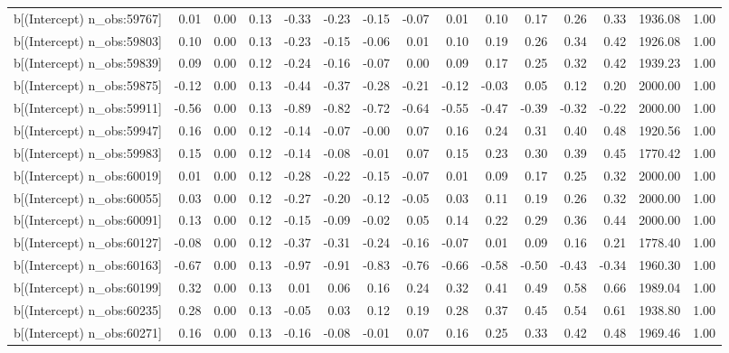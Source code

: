 \begin{table}[ht]
\begin{tabular}{rrrrrrrrrrrrrrr}
  b[(Intercept) n\_obs:59767] & 0.01 & 0.00 & 0.13 & -0.33 & -0.23 & -0.15 & -0.07 & 0.01 & 0.10 & 0.17 & 0.26 & 0.33 & 1936.08 & 1.00 \\ 
  b[(Intercept) n\_obs:59803] & 0.10 & 0.00 & 0.13 & -0.23 & -0.15 & -0.06 & 0.01 & 0.10 & 0.19 & 0.26 & 0.34 & 0.42 & 1926.08 & 1.00 \\ 
  b[(Intercept) n\_obs:59839] & 0.09 & 0.00 & 0.12 & -0.24 & -0.16 & -0.07 & 0.00 & 0.09 & 0.17 & 0.25 & 0.32 & 0.42 & 1939.23 & 1.00 \\ 
  b[(Intercept) n\_obs:59875] & -0.12 & 0.00 & 0.13 & -0.44 & -0.37 & -0.28 & -0.21 & -0.12 & -0.03 & 0.05 & 0.12 & 0.20 & 2000.00 & 1.00 \\ 
  b[(Intercept) n\_obs:59911] & -0.56 & 0.00 & 0.13 & -0.89 & -0.82 & -0.72 & -0.64 & -0.55 & -0.47 & -0.39 & -0.32 & -0.22 & 2000.00 & 1.00 \\ 
  b[(Intercept) n\_obs:59947] & 0.16 & 0.00 & 0.12 & -0.14 & -0.07 & -0.00 & 0.07 & 0.16 & 0.24 & 0.31 & 0.40 & 0.48 & 1920.56 & 1.00 \\ 
  b[(Intercept) n\_obs:59983] & 0.15 & 0.00 & 0.12 & -0.14 & -0.08 & -0.01 & 0.07 & 0.15 & 0.23 & 0.30 & 0.39 & 0.45 & 1770.42 & 1.00 \\ 
  b[(Intercept) n\_obs:60019] & 0.01 & 0.00 & 0.12 & -0.28 & -0.22 & -0.15 & -0.07 & 0.01 & 0.09 & 0.17 & 0.25 & 0.32 & 2000.00 & 1.00 \\ 
  b[(Intercept) n\_obs:60055] & 0.03 & 0.00 & 0.12 & -0.27 & -0.20 & -0.12 & -0.05 & 0.03 & 0.11 & 0.19 & 0.26 & 0.32 & 2000.00 & 1.00 \\ 
  b[(Intercept) n\_obs:60091] & 0.13 & 0.00 & 0.12 & -0.15 & -0.09 & -0.02 & 0.05 & 0.14 & 0.22 & 0.29 & 0.36 & 0.44 & 2000.00 & 1.00 \\ 
  b[(Intercept) n\_obs:60127] & -0.08 & 0.00 & 0.12 & -0.37 & -0.31 & -0.24 & -0.16 & -0.07 & 0.01 & 0.09 & 0.16 & 0.21 & 1778.40 & 1.00 \\ 
  b[(Intercept) n\_obs:60163] & -0.67 & 0.00 & 0.13 & -0.97 & -0.91 & -0.83 & -0.76 & -0.66 & -0.58 & -0.50 & -0.43 & -0.34 & 1960.30 & 1.00 \\ 
  b[(Intercept) n\_obs:60199] & 0.32 & 0.00 & 0.13 & 0.01 & 0.06 & 0.16 & 0.24 & 0.32 & 0.41 & 0.49 & 0.58 & 0.66 & 1989.04 & 1.00 \\ 
  b[(Intercept) n\_obs:60235] & 0.28 & 0.00 & 0.13 & -0.05 & 0.03 & 0.12 & 0.19 & 0.28 & 0.37 & 0.45 & 0.54 & 0.61 & 1938.80 & 1.00 \\ 
  b[(Intercept) n\_obs:60271] & 0.16 & 0.00 & 0.13 & -0.16 & -0.08 & -0.01 & 0.07 & 0.16 & 0.25 & 0.33 & 0.42 & 0.48 & 1969.46 & 1.00 \\ 

\end{tabular}
\end{table}
